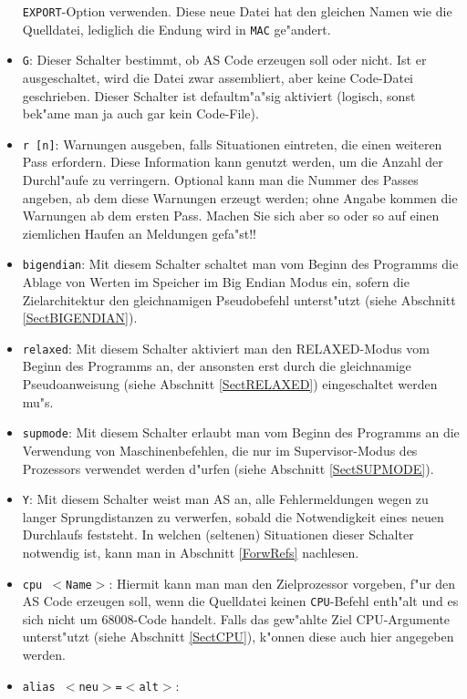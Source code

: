 \documentclass[12pt,a4paper,twoside]{report}
\newcommand{\tty}[1]{{\tt #1}}
\begin{document}
\begin{itemize}
{      \tty{EXPORT}-Option verwenden.  Diese neue Datei hat den gleichen
      Namen wie die Quelldatei, lediglich die Endung wird in \tty{MAC} ge"andert.}
\item{\tty{G}: Dieser Schalter bestimmt, ob AS Code erzeugen soll oder nicht.
      Ist er ausgeschaltet, wird die Datei zwar assembliert,
      aber keine Code-Datei geschrieben. Dieser Schalter ist defaultm"a"sig aktiviert
      (logisch, sonst bek"ame man ja auch gar kein Code-File).}
\item{\tty{r [n]}: Warnungen ausgeben, falls Situationen eintreten, die
      einen weiteren Pass erfordern.  Diese Information kann genutzt
      werden, um die Anzahl der Durchl"aufe zu verringern.  Optional kann
      man die Nummer des Passes angeben, ab dem diese Warnungen erzeugt
      werden; ohne Angabe kommen die Warnungen ab dem ersten Pass.  Machen
      Sie sich aber so oder so auf einen ziemlichen Haufen an Meldungen
      gefa"st!!}
\item{\tty{bigendian}: Mit diesem Schalter schaltet man vom Beginn des
      Programms die Ablage von Werten im Speicher im Big Endian Modus ein,
      sofern die Zielarchitektur den gleichnamigen Pseudobefehl unterst"utzt
      (siehe Abschnitt \ref{SectBIGENDIAN}).}
\item{\tty{relaxed}: Mit diesem Schalter aktiviert man den RELAXED-Modus
      vom Beginn des Programms an, der ansonsten erst durch die gleichnamige
      Pseudoanweisung (siehe Abschnitt \ref{SectRELAXED}) eingeschaltet
      werden mu"s.}
\item{\tty{supmode}: Mit diesem Schalter erlaubt man vom Beginn des Programms
      an die Verwendung von Maschinenbefehlen, die nur im Supervisor-Modus
      des Prozessors verwendet werden d"urfen (siehe Abschnitt \ref{SectSUPMODE}).}
\item{\tty{Y}: Mit diesem Schalter weist man AS an, alle Fehlermeldungen
      wegen zu langer Sprungdistanzen zu verwerfen, sobald die Notwendigkeit
      eines neuen Durchlaufs feststeht.  In welchen (seltenen) Situationen
      dieser Schalter notwendig ist, kann man in Abschnitt \ref{ForwRefs}
      nachlesen.}
\item{\tty{cpu $<$Name$>$}: Hiermit kann man man den Zielprozessor
      vorgeben, f"ur den AS Code erzeugen soll, wenn die Quelldatei keinen
      {\tt CPU}-Befehl enth"alt und es sich nicht um 68008-Code handelt.
      Falls das gew"ahlte Ziel CPU-Argumente unterst"utzt (siehe Abschnitt
      \ref{SectCPU}), k"onnen diese auch hier angegeben werden.}
\item{\tty{alias $<$neu$>$=$<$alt$>$}:\\
}
\end{itemize}
\end{document}
